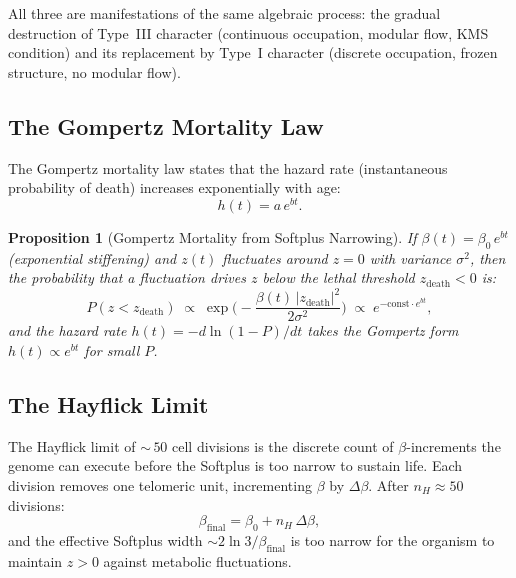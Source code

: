 \documentclass[12pt, letterpaper]{article}
\theoremstyle{plain}
\newtheorem{proposition}[theorem]{Proposition}
\theoremstyle{definition}
\theoremstyle{remark}
\begin{document}
All three are manifestations of the same algebraic process: the gradual destruction of Type~III character (continuous occupation, modular flow, KMS condition) and its replacement by Type~I character (discrete occupation, frozen structure, no modular flow).

\subsection{The Gompertz Mortality Law}

The Gompertz mortality law states that the hazard rate (instantaneous probability of death) increases exponentially with age:
\begin{equation}\label{eq:gompertz_mortality}
  h(t) = a\,e^{bt}.
\end{equation}

\begin{proposition}[Gompertz Mortality from Softplus Narrowing]\label{prop:mortality}
  If $\beta(t) = \beta_0\,e^{bt}$ (exponential stiffening) and $z(t)$ fluctuates around $z = 0$ with variance $\sigma^2$, then the probability that a fluctuation drives $z$ below the lethal threshold $z_{\text{death}} < 0$ is:
  \begin{equation}
    P(z < z_{\text{death}}) \;\propto\; \exp\!\biggl(-\frac{\beta(t)\,|z_{\text{death}}|^2}{2\sigma^2}\biggr)
    \;\propto\; e^{-\text{const}\cdot e^{bt}},
  \end{equation}
  and the hazard rate $h(t) = -d\ln(1 - P)/dt$ takes the Gompertz form $h(t) \propto e^{bt}$ for small $P$.
\end{proposition}

\subsection{The Hayflick Limit}

The Hayflick limit of ${\sim\,}50$ cell divisions is the discrete count of $\beta$-increments the genome can execute before the Softplus is too narrow to sustain life. Each division removes one telomeric unit, incrementing $\beta$ by $\Delta\beta$. After $n_H \approx 50$ divisions:
\begin{equation}
  \beta_{\text{final}} = \beta_0 + n_H\,\Delta\beta,
\end{equation}
and the effective Softplus width $\sim 2\ln 3 / \beta_{\text{final}}$ is too narrow for the organism to maintain $z > 0$ against metabolic fluctuations.


\end{document}
